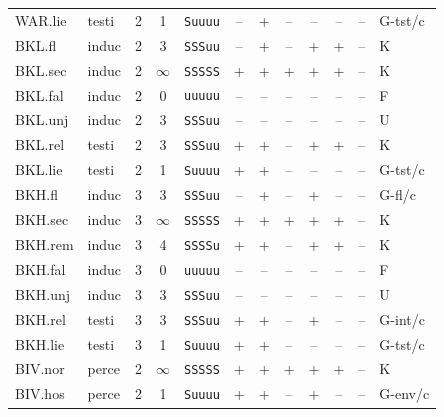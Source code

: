 {\begin{longtable}{@{}llcccccccccl@{}}
WAR.lie & testi & 2 & 1 & \texttt{Suuuu} & \textsf{--} & \textsf{+} & \textsf{--} & \textsf{--} & \textsf{--} & -- & G-tst/c \\
BKL.fl & induc & 2 & 3 & \texttt{SSSuu} & \textsf{--} & \textsf{+} & \textsf{--} & \textsf{+} & \textsf{+} & -- & K \\
BKL.sec & induc & 2 & $\infty$ & \texttt{SSSSS} & \textsf{+} & \textsf{+} & \textsf{+} & \textsf{+} & \textsf{+} & -- & K \\
BKL.fal & induc & 2 & 0 & \texttt{uuuuu} & \textsf{--} & \textsf{--} & \textsf{--} & \textsf{--} & \textsf{--} & -- & F \\
BKL.unj & induc & 2 & 3 & \texttt{SSSuu} & \textsf{--} & \textsf{--} & \textsf{--} & \textsf{--} & \textsf{--} & -- & U \\
BKL.rel & testi & 2 & 3 & \texttt{SSSuu} & \textsf{+} & \textsf{+} & \textsf{--} & \textsf{+} & \textsf{+} & -- & K \\
BKL.lie & testi & 2 & 1 & \texttt{Suuuu} & \textsf{+} & \textsf{+} & \textsf{--} & \textsf{--} & \textsf{--} & -- & G-tst/c \\
BKH.fl & induc & 3 & 3 & \texttt{SSSuu} & \textsf{--} & \textsf{+} & \textsf{--} & \textsf{+} & \textsf{--} & -- & G-fl/c \\
BKH.sec & induc & 3 & $\infty$ & \texttt{SSSSS} & \textsf{+} & \textsf{+} & \textsf{+} & \textsf{+} & \textsf{+} & -- & K \\
BKH.rem & induc & 3 & 4 & \texttt{SSSSu} & \textsf{+} & \textsf{+} & \textsf{--} & \textsf{+} & \textsf{+} & -- & K \\
BKH.fal & induc & 3 & 0 & \texttt{uuuuu} & \textsf{--} & \textsf{--} & \textsf{--} & \textsf{--} & \textsf{--} & -- & F \\
BKH.unj & induc & 3 & 3 & \texttt{SSSuu} & \textsf{--} & \textsf{--} & \textsf{--} & \textsf{--} & \textsf{--} & -- & U \\
BKH.rel & testi & 3 & 3 & \texttt{SSSuu} & \textsf{+} & \textsf{+} & \textsf{--} & \textsf{+} & \textsf{--} & -- & G-int/c \\
BKH.lie & testi & 3 & 1 & \texttt{Suuuu} & \textsf{+} & \textsf{+} & \textsf{--} & \textsf{--} & \textsf{--} & -- & G-tst/c \\
BIV.nor & perce & 2 & $\infty$ & \texttt{SSSSS} & \textsf{+} & \textsf{+} & \textsf{+} & \textsf{+} & \textsf{+} & -- & K \\
BIV.hos & perce & 2 & 1 & \texttt{Suuuu} & \textsf{+} & \textsf{+} & \textsf{--} & \textsf{+} & \textsf{--} & -- & G-env/c \\

\end{longtable}}
